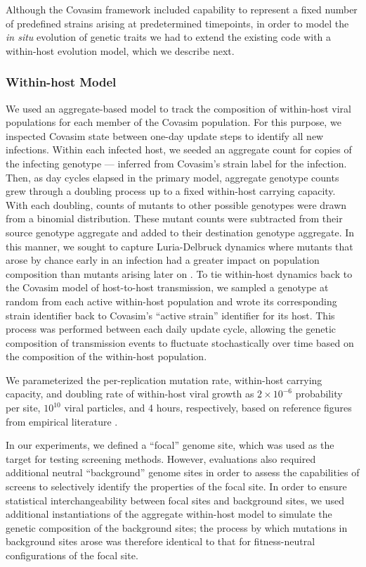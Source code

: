 Although the Covasim framework included capability to represent a fixed number of predefined strains arising at predetermined timepoints, in order to model the \textit{in situ} evolution of genetic traits we had to extend the existing code with a within-host evolution model, which we describe next.

\subsubsection{Within-host Model}

We used an aggregate-based model to track the composition of within-host viral populations for each member of the Covasim population.
For this purpose, we inspected Covasim state between one-day update steps to identify all new infections.
Within each infected host, we seeded an aggregate count for copies of the infecting genotype --- inferred from Covasim's strain label for the infection.
Then, as day cycles elapsed in the primary model, aggregate genotype counts grew through a doubling process up to a fixed within-host carrying capacity.
With each doubling, counts of mutants to other possible genotypes were drawn from a binomial distribution.
These mutant counts were subtracted from their source genotype aggregate and added to their destination genotype aggregate.
In this manner, we sought to capture Luria-Delbruck dynamics where mutants that arose by chance early in an infection had a greater impact on population composition than mutants arising later on \citep{luriaMutationsBacteriaVirus1943}.
To tie within-host dynamics back to the Covasim model of host-to-host transmission, we sampled a genotype at random from each active within-host population and wrote its corresponding strain identifier back to Covasim's ``active strain'' identifier for its host.
This process was performed between each daily update cycle, allowing the genetic composition of transmission events to fluctuate stochastically over time based on the composition of the within-host population.

We parameterized the per-replication mutation rate, within-host carrying capacity, and doubling rate of within-host viral growth as $2\times10^{-6}$ probability per site, $10^{10}$ viral particles, and 4 hours, respectively, based on reference figures from empirical literature \citep{Markov2023,Sender2021,Gunawardana2022}.

In our experiments, we defined a ``focal'' genome site, which was used as the target for testing screening methods.
However, evaluations also required additional neutral ``background'' genome sites in order to assess the capabilities of screens to selectively identify the properties of the focal site.
In order to ensure statistical interchangeability between focal sites and background sites, we used additional instantiations of the aggregate within-host model to simulate the genetic composition of the background sites; the process by which mutations in background sites arose was therefore identical to that for fitness-neutral configurations of the focal site.

